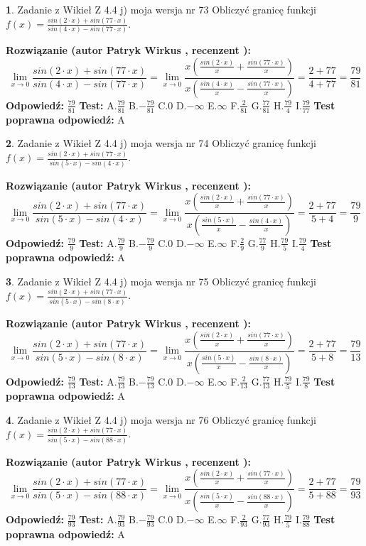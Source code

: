 \documentclass[12pt, a4paper]{article}
\theoremstyle{definition} %
\newtheorem{zad}{}
\newcommand{\zadStart}[1]{\begin{zad}#1\newline}
\newcommand{\zadStop}{\end{zad}}
\newcommand{\rozwStart}[2]{\noindent \textbf{Rozwiązanie (autor #1 , recenzent #2): }\newline}
\newcommand{\rozwStop}{\newline}
\newcommand{\odpStart}{\noindent \textbf{Odpowiedź:}\newline}
\newcommand{\odpStop}{\newline}
\newcommand{\testStart}{\noindent \textbf{Test:}\newline}
\newcommand{\testStop}{\newline}
\newcommand{\kluczStart}{\noindent \textbf{Test poprawna odpowiedź:}\newline}
\newcommand{\kluczStop}{\newline}
\begin{document}
\zadStart{Zadanie z Wikieł Z 4.4 j) moja wersja nr 73}
Obliczyć granicę funkcji $f(x)=\frac{sin(2\cdot x) +sin(77\cdot x)}{sin(4\cdot x) -sin(77\cdot x)}$.
\zadStop
\rozwStart{Patryk Wirkus}{}
$$\lim\limits_{x\to 0}\frac{sin(2\cdot x) +sin(77\cdot x)}{sin(4\cdot x) -sin(77\cdot x)}=\lim\limits_{x\to 0}\frac{x(\frac{sin(2\cdot x)}{x}+\frac{sin(77\cdot x)}{x})}{x(\frac{sin(4\cdot x)}{x}-\frac{sin(77\cdot x)}{x})}=\frac{2+77}{4+77} = \frac{79}{81}$$
\rozwStop
\odpStart
$\frac{79}{81}$
\odpStop
\testStart
A.$\frac{79}{81}$
B.$-\frac{79}{81}$
C.$0$
D.$-\infty$
E.$\infty$
F.$\frac{2}{81}$
G.$\frac{77}{81}$
H.$\frac{79}{4}$
I.$\frac{79}{77}$
\testStop
\kluczStart
A
\kluczStop



\zadStart{Zadanie z Wikieł Z 4.4 j) moja wersja nr 74}
Obliczyć granicę funkcji $f(x)=\frac{sin(2\cdot x) +sin(77\cdot x)}{sin(5\cdot x) -sin(4\cdot x)}$.
\zadStop
\rozwStart{Patryk Wirkus}{}
$$\lim\limits_{x\to 0}\frac{sin(2\cdot x) +sin(77\cdot x)}{sin(5\cdot x) -sin(4\cdot x)}=\lim\limits_{x\to 0}\frac{x(\frac{sin(2\cdot x)}{x}+\frac{sin(77\cdot x)}{x})}{x(\frac{sin(5\cdot x)}{x}-\frac{sin(4\cdot x)}{x})}=\frac{2+77}{5+4} = \frac{79}{9}$$
\rozwStop
\odpStart
$\frac{79}{9}$
\odpStop
\testStart
A.$\frac{79}{9}$
B.$-\frac{79}{9}$
C.$0$
D.$-\infty$
E.$\infty$
F.$\frac{2}{9}$
G.$\frac{77}{9}$
H.$\frac{79}{5}$
I.$\frac{79}{4}$
\testStop
\kluczStart
A
\kluczStop



\zadStart{Zadanie z Wikieł Z 4.4 j) moja wersja nr 75}
Obliczyć granicę funkcji $f(x)=\frac{sin(2\cdot x) +sin(77\cdot x)}{sin(5\cdot x) -sin(8\cdot x)}$.
\zadStop
\rozwStart{Patryk Wirkus}{}
$$\lim\limits_{x\to 0}\frac{sin(2\cdot x) +sin(77\cdot x)}{sin(5\cdot x) -sin(8\cdot x)}=\lim\limits_{x\to 0}\frac{x(\frac{sin(2\cdot x)}{x}+\frac{sin(77\cdot x)}{x})}{x(\frac{sin(5\cdot x)}{x}-\frac{sin(8\cdot x)}{x})}=\frac{2+77}{5+8} = \frac{79}{13}$$
\rozwStop
\odpStart
$\frac{79}{13}$
\odpStop
\testStart
A.$\frac{79}{13}$
B.$-\frac{79}{13}$
C.$0$
D.$-\infty$
E.$\infty$
F.$\frac{2}{13}$
G.$\frac{77}{13}$
H.$\frac{79}{5}$
I.$\frac{79}{8}$
\testStop
\kluczStart
A
\kluczStop



\zadStart{Zadanie z Wikieł Z 4.4 j) moja wersja nr 76}
Obliczyć granicę funkcji $f(x)=\frac{sin(2\cdot x) +sin(77\cdot x)}{sin(5\cdot x) -sin(88\cdot x)}$.
\zadStop
\rozwStart{Patryk Wirkus}{}
$$\lim\limits_{x\to 0}\frac{sin(2\cdot x) +sin(77\cdot x)}{sin(5\cdot x) -sin(88\cdot x)}=\lim\limits_{x\to 0}\frac{x(\frac{sin(2\cdot x)}{x}+\frac{sin(77\cdot x)}{x})}{x(\frac{sin(5\cdot x)}{x}-\frac{sin(88\cdot x)}{x})}=\frac{2+77}{5+88} = \frac{79}{93}$$
\rozwStop
\odpStart
$\frac{79}{93}$
\odpStop
\testStart
A.$\frac{79}{93}$
B.$-\frac{79}{93}$
C.$0$
D.$-\infty$
E.$\infty$
F.$\frac{2}{93}$
G.$\frac{77}{93}$
H.$\frac{79}{5}$
I.$\frac{79}{88}$
\testStop
\kluczStart
A
\kluczStop
\end{document}
